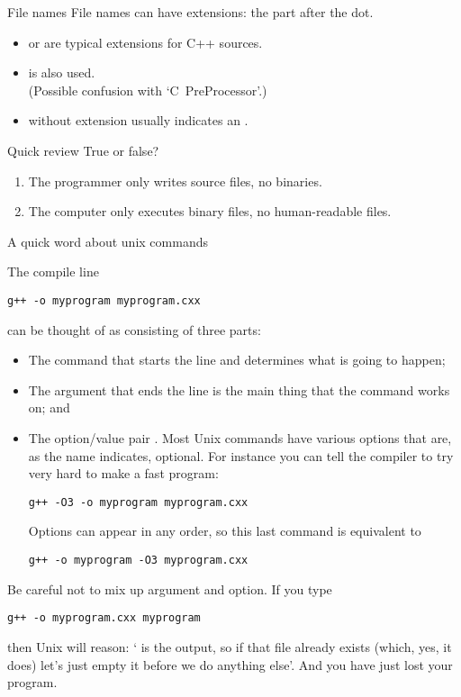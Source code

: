 

\begin{block}{File names}
  \label{sl:file-ext}
  File names can have extensions: the part after the dot.
  \begin{itemize}
  \item {} or  are typical extensions for
    C++ sources.
  \item {} is also used.\\
    (Possible confusion with `C~PreProcessor'.)
  \item {} without extension usually indicates an .
  \end{itemize}
\end{block}

\begin{exercise}{Quick review}
  \label{q:compiler}
  True or false?
  \begin{enumerate}
  \item The programmer only writes source files, no binaries.
  \item The computer only executes binary files, no human-readable files.
  \end{enumerate}
\end{exercise}

 {A quick word about unix commands}

The compile line
\begin{verbatim}
g++ -o myprogram myprogram.cxx
\end{verbatim}
can be thought of as consisting of three parts:
\begin{itemize}
\item The command  that starts the line and determines what is
  going to happen;
\item The argument  that ends the line is the main
  thing that the command works on; and
\item The option/value pair . Most Unix commands have
  various options that are, as the name indicates, optional. For
  instance you can tell the compiler to try very hard to make a fast program:
\begin{verbatim}
g++ -O3 -o myprogram myprogram.cxx
\end{verbatim}
  Options can appear in any order, so this last command is equivalent to
\begin{verbatim}
g++ -o myprogram -O3 myprogram.cxx
\end{verbatim}
\end{itemize}
Be careful not to mix up argument and option. If you type
\begin{verbatim}
g++ -o myprogram.cxx myprogram
\end{verbatim}
then Unix will reason: ` is the output, so if that
file already exists (which, yes, it does) let's just empty it before
we do anything else'. And you have just lost your program.

